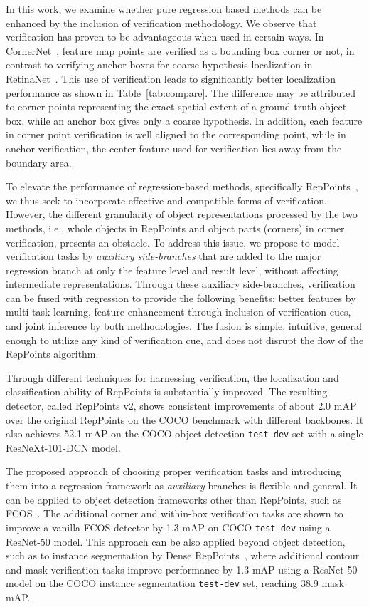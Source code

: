 \documentclass{article}
\begin{document}
In this work, we examine whether pure regression based methods can be enhanced by the inclusion of verification methodology. We observe that verification has proven to be advantageous when used in certain ways. In CornerNet~\cite{CornerNet}, feature map points are verified as a bounding box corner or not, in contrast to verifying anchor boxes for coarse hypothesis localization in RetinaNet~\cite{RetinaNet}. This use of verification leads to significantly better localization performance as shown in Table~\ref{tab:compare}. The difference may be attributed to corner points representing the exact spatial extent of a ground-truth object box, while an anchor box gives only a coarse hypothesis. In addition, each feature in corner point verification is well aligned to the corresponding point, while in anchor verification, the center feature used for verification lies away from the boundary area.

To elevate the performance of regression-based methods, specifically RepPoints~\cite{yang19reppts}, we thus seek to incorporate effective and compatible forms of verification. However, the different granularity of object representations processed by the two methods, i.e., whole objects in RepPoints and object parts (corners) in corner verification, presents an obstacle. To address this issue, we propose to model verification tasks by \emph{auxiliary side-branches} that are added to the major regression branch at only the feature level and result level, without affecting intermediate representations. Through these auxiliary side-branches, verification can be fused with regression to provide the following benefits: better features by multi-task learning, feature enhancement through inclusion of verification cues, and joint inference by both methodologies. The fusion is simple, intuitive, general enough to utilize any kind of verification cue, and does not disrupt the flow of the RepPoints algorithm.

Through different techniques for harnessing verification, the localization and classification ability of RepPoints is substantially improved. The resulting detector, called RepPoints v2, shows consistent improvements of about 2.0 mAP over the original RepPoints on the COCO benchmark with different backbones. It also achieves 52.1 mAP on the COCO object detection \texttt{test-dev} set with a single ResNeXt-101-DCN model.

The proposed approach of choosing proper verification tasks and introducing them into a regression framework as \emph{auxiliary} branches is flexible and general. It can be applied to object detection frameworks other than RepPoints, such as FCOS~\cite{tian2019fcos}. The additional corner and within-box verification tasks are shown to improve a vanilla FCOS detector by 1.3 mAP on COCO \texttt{test-dev} using a ResNet-50 model. This approach can be also applied beyond object detection, such as to instance segmentation by Dense RepPoints~\cite{yang19densereppts}, where additional contour and mask verification tasks improve performance by 1.3 mAP using a ResNet-50 model on the COCO instance segmentation \texttt{test-dev} set, reaching 38.9 mask mAP.
\end{document}
